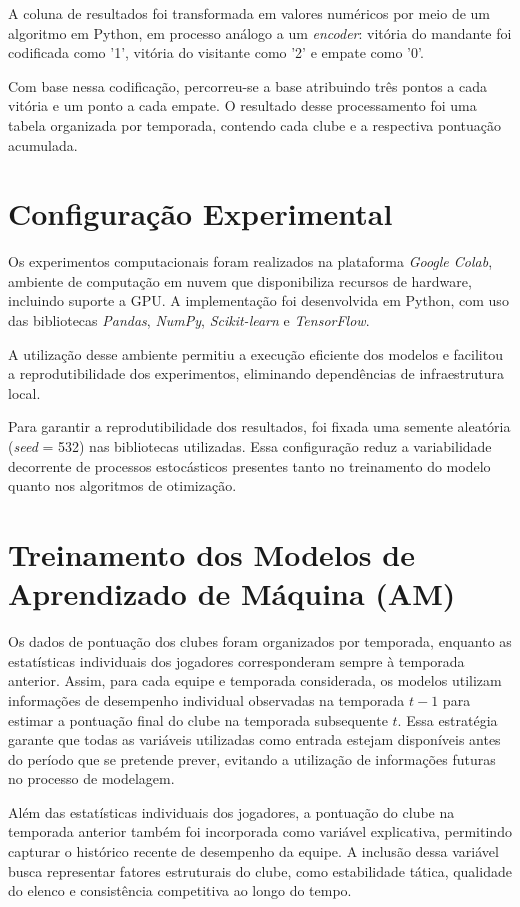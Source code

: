 A coluna de resultados foi transformada em valores numéricos por meio de um algoritmo em Python, em processo análogo a um \textit{encoder}: 
vitória do mandante foi codificada como '1', vitória do visitante como '2' e empate como '0'.

Com base nessa codificação, percorreu-se a base atribuindo três pontos a cada vitória e um ponto a cada empate. 
O resultado desse processamento foi uma tabela organizada por temporada, contendo cada clube e a respectiva pontuação acumulada.

\section{Configuração Experimental}

Os experimentos computacionais foram realizados na plataforma \textit{Google Colab}, 
ambiente de computação em nuvem que disponibiliza recursos de hardware, 
incluindo suporte a GPU. A implementação foi desenvolvida em Python, com uso 
das bibliotecas \textit{Pandas}, \textit{NumPy}, \textit{Scikit-learn} 
e \textit{TensorFlow}.

A utilização desse ambiente permitiu a execução eficiente dos 
modelos e facilitou a reprodutibilidade dos experimentos, eliminando 
dependências de infraestrutura local.

Para garantir a reprodutibilidade dos resultados, foi fixada uma semente 
aleatória (\textit{seed} = 532) nas bibliotecas utilizadas. Essa configuração 
reduz a variabilidade decorrente de processos estocásticos presentes tanto 
no treinamento do modelo quanto nos algoritmos de otimização.

\section{Treinamento dos Modelos de Aprendizado de Máquina (AM)}

Os dados de pontuação dos clubes foram organizados por temporada, enquanto as estatísticas individuais dos jogadores corresponderam sempre à temporada anterior. 
Assim, para cada equipe e temporada considerada, os modelos utilizam informações de desempenho individual observadas na temporada $t-1$ para estimar a pontuação 
final do clube na temporada subsequente $t$. Essa estratégia garante que todas as variáveis utilizadas como entrada estejam disponíveis antes do período que se 
pretende prever, evitando a utilização de informações futuras no processo de modelagem.

Além das estatísticas individuais dos jogadores, a pontuação do clube na temporada anterior também foi incorporada como variável explicativa, permitindo capturar 
o histórico recente de desempenho da equipe. A inclusão dessa variável busca representar fatores estruturais do clube, como estabilidade tática, qualidade do elenco 
e consistência competitiva ao longo do tempo.


